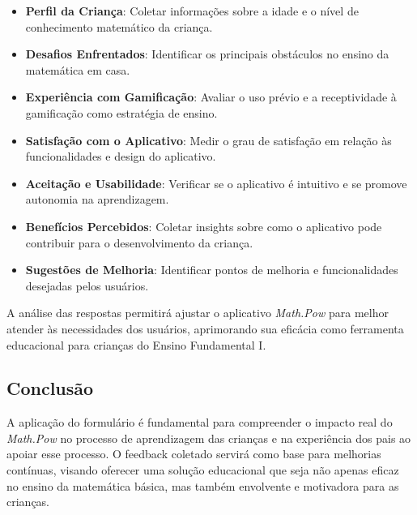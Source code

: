 \begin{itemize}
    \item \textbf{Perfil da Criança}: Coletar informações sobre a idade e o nível de conhecimento matemático da criança.
    \item \textbf{Desafios Enfrentados}: Identificar os principais obstáculos no ensino da matemática em casa.
    \item \textbf{Experiência com Gamificação}: Avaliar o uso prévio e a receptividade à gamificação como estratégia de ensino.
    \item \textbf{Satisfação com o Aplicativo}: Medir o grau de satisfação em relação às funcionalidades e design do aplicativo.
    \item \textbf{Aceitação e Usabilidade}: Verificar se o aplicativo é intuitivo e se promove autonomia na aprendizagem.
    \item \textbf{Benefícios Percebidos}: Coletar insights sobre como o aplicativo pode contribuir para o desenvolvimento da criança.
    \item \textbf{Sugestões de Melhoria}: Identificar pontos de melhoria e funcionalidades desejadas pelos usuários.
\end{itemize}

A análise das respostas permitirá ajustar o aplicativo \textit{Math.Pow} para melhor atender às necessidades dos usuários, aprimorando sua eficácia como ferramenta educacional para crianças do Ensino Fundamental I.

\subsection{Conclusão}

A aplicação do formulário é fundamental para compreender o impacto real do \textit{Math.Pow} no processo de aprendizagem das crianças e na experiência dos pais ao apoiar esse processo. O feedback coletado servirá como base para melhorias contínuas, visando oferecer uma solução educacional que seja não apenas eficaz no ensino da matemática básica, mas também envolvente e motivadora para as crianças.
